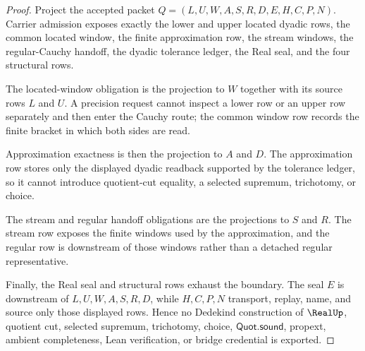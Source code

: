 \begin{proof}
Project the accepted packet $Q=(L,U,W,A,S,R,D,E,H,C,P,N)$. Carrier admission exposes exactly the lower and upper located dyadic rows, the common located window, the finite approximation row, the stream windows, the regular-Cauchy handoff, the dyadic tolerance ledger, the Real seal, and the four structural rows.

The located-window obligation is the projection to $W$ together with its source rows $L$ and $U$. A precision request cannot inspect a lower row or an upper row separately and then enter the Cauchy route; the common window row records the finite bracket in which both sides are read.

Approximation exactness is then the projection to $A$ and $D$. The approximation row stores only the displayed dyadic readback supported by the tolerance ledger, so it cannot introduce quotient-cut equality, a selected supremum, trichotomy, or choice.

The stream and regular handoff obligations are the projections to $S$ and $R$. The stream row exposes the finite windows used by the approximation, and the regular row is downstream of those windows rather than a detached regular representative.

Finally, the Real seal and structural rows exhaust the boundary. The seal $E$ is downstream of $L,U,W,A,S,R,D$, while $H,C,P,N$ transport, replay, name, and source only those displayed rows. Hence no Dedekind construction of $\RealUp$, quotient cut, selected supremum, trichotomy, choice, $\mathsf{Quot.sound}$, propext, ambient completeness, Lean verification, or bridge credential is exported.
\end{proof}

